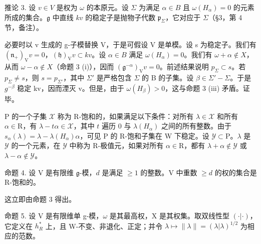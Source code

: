 推论 3. 设 \(v \in V\) 是权为 \(\omega\) 的本原元。设 \(\Sigma\) 为满足 \(\alpha \in B\) 且 \(\omega(H_{\alpha}) = 0\) 的元素所成的集合。\(\mathfrak{g}\) 中直线 \(kv\) 的稳定子是抛物子代数 \(\mathfrak{p}_{\Sigma}\)，它对应于 \(\Sigma\)（§3，第 4 节，备注）。

必要时以 v 生成的 g-子模替换 V，于是可假设 V 是单模。设 s 为稳定子。我们有 \((\mathfrak{n}_{+})_{\mathrm{V}}v = 0\)，\((\mathfrak{h})_{\mathrm{V}}v \subset kv\)。设 \(\alpha \in B\) 满足 \(\omega(H_{\alpha}) = 0\)。我们有 \(\omega + \alpha \notin X\)，从而 \(\omega - \alpha \notin X\)（命题 3 (i)），因而 \((\mathfrak{g}^{-\alpha})_{\mathrm{V}}v = 0\)。前述结果说明 \(p_{\Sigma} \subset s\)。若 \(p_{\Sigma} \neq s\)，则 \(s = p_{\Sigma'}\)，其中 \(\Sigma'\) 是严格包含 \(\Sigma\) 的 B 的子集。设 \(\beta \in \Sigma' - \Sigma\)。于是 \(g^{-\beta}\) 稳定 kv，因而湮灭 v。但是，由于 \(\omega(H_{\beta}) > 0\)，这与命题 3 (iii) 矛盾。证毕。

P 的一个子集 \(\mathcal{X}\) 称为 R-饱和的，如果满足以下条件：对所有 \(\lambda \in \mathcal{X}\) 和所有 \(\alpha \in \mathrm{R}\)，有 \(\lambda - t\alpha \in \mathcal{X}\)，其中 \(t\) 遍历 0 与 \(\lambda(H_{\alpha})\) 之间的所有整数。由于 \(s_{\alpha}(\lambda) = \lambda - \lambda(H_{\alpha})\alpha\)，可见 P 的 R-饱和子集在 W 下稳定。设 \(\mathcal{Y} \subset \mathrm{P}\)。\(\lambda\) 是 \(\mathcal{Y}\) 的一个元素，在 \(\mathcal{Y}\) 中称为 R-极值元，如果对所有 \(\alpha \in \mathrm{R}\)，都有 \(\lambda + \alpha \notin \mathcal{Y}\) 或 \(\lambda - \alpha \notin \mathcal{Y}\)。

命题 4. 设 \(\mathrm{V}\) 是有限维 \(\mathfrak{g}\)-模，\(d\) 是满足 \(\geq 1\) 的整数。\(\mathrm{V}\) 中重数 \(\geq d\) 的权的集合是 R-饱和的。

这立即由命题 3 得出。

命题 5. 设 V 是有限维单 g-模，\(\omega\) 是其最高权，X 是其权集。取双线性型 \((\cdot|\cdot)\)，它定义在 \(h_{R}^{*}\) 上，且 W-不变、非退化、正定；并令 \(\lambda\mapsto\|\lambda\|=(\lambda|\lambda)^{1/2}\) 为相应的范数。


